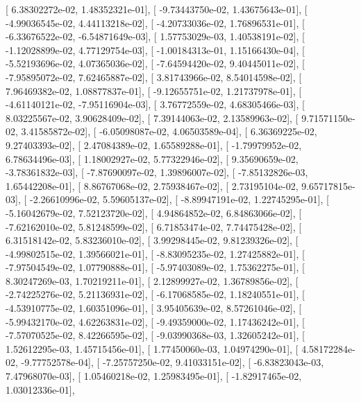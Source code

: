 \documentclass{article}
\begin{document}
       [  6.38302272e-02,   1.48352321e-01],
       [ -9.73443750e-02,   1.43675643e-01],
       [ -4.99036545e-02,   4.44113218e-02],
       [ -4.20733036e-02,   1.76896531e-01],
       [ -6.33676522e-02,  -6.54871649e-03],
       [  1.57753029e-03,   1.40538191e-02],
       [ -1.12028899e-02,   4.77129754e-03],
       [ -1.00184313e-01,   1.15166430e-04],
       [ -5.52193696e-02,   4.07365036e-02],
       [ -7.64594420e-02,   9.40445011e-02],
       [ -7.95895072e-02,   7.62465887e-02],
       [  3.81743966e-02,   8.54014598e-02],
       [  7.96469382e-02,   1.08877837e-01],
       [ -9.12655751e-02,   1.21737978e-01],
       [ -4.61140121e-02,  -7.95116904e-03],
       [  3.76772559e-02,   4.68305466e-03],
       [  8.03225567e-02,   3.90628409e-02],
       [  7.39144063e-02,   2.13589963e-02],
       [  9.71571150e-02,   3.41585872e-02],
       [ -6.05098087e-02,   4.06503589e-04],
       [  6.36369225e-02,   9.27403393e-02],
       [  2.47084389e-02,   1.65589288e-01],
       [ -1.79979952e-02,   6.78634496e-03],
       [  1.18002927e-02,   5.77322946e-02],
       [  9.35690659e-02,  -3.78361832e-03],
       [ -7.87690097e-02,   1.39896007e-02],
       [ -7.85132826e-03,   1.65442208e-01],
       [  8.86767068e-02,   2.75938467e-02],
       [  2.73195104e-02,   9.65717815e-03],
       [ -2.26610996e-02,   5.59605137e-02],
       [ -8.89947191e-02,   1.22745295e-01],
       [ -5.16042679e-02,   7.52123720e-02],
       [  4.94864852e-02,   6.84863066e-02],
       [ -7.62162010e-02,   5.81248599e-02],
       [  6.71853474e-02,   7.74475428e-02],
       [  6.31518142e-02,   5.83236010e-02],
       [  3.99298445e-02,   9.81239326e-02],
       [ -4.99802515e-02,   1.39566021e-01],
       [ -8.83095235e-02,   1.27425882e-01],
       [ -7.97504549e-02,   1.07790888e-01],
       [ -5.97403089e-02,   1.75362275e-01],
       [  8.30247269e-03,   1.70219211e-01],
       [  2.12899927e-02,   1.36789856e-02],
       [ -2.74225276e-02,   5.21136931e-02],
       [ -6.17068585e-02,   1.18240551e-01],
       [ -4.53910775e-02,   1.60351096e-01],
       [  3.95405639e-02,   8.57261046e-02],
       [ -5.99432170e-02,   4.62263831e-02],
       [ -9.49359000e-02,   1.17436242e-01],
       [ -7.57070525e-02,   8.42266595e-02],
       [ -9.03990368e-03,   1.32605242e-01],
       [  1.52612295e-03,   1.45715456e-01],
       [  1.77450060e-03,   1.04974290e-01],
       [  4.58172284e-02,  -9.77752578e-04],
       [ -7.25757250e-02,   9.41033151e-02],
       [ -6.83823043e-03,   7.47968070e-03],
       [  1.05460218e-02,   1.25983495e-01],
       [ -1.82917465e-02,   1.03012336e-01],
\end{document}
